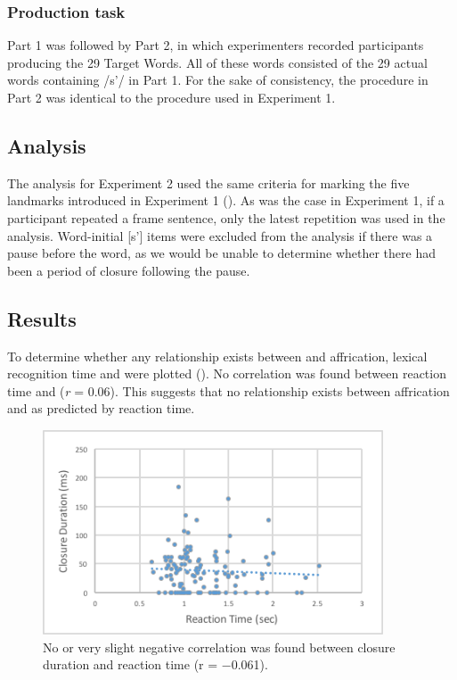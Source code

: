 \documentclass[output=paper
,newtxmath
,modfonts
,nonflat]{langsci/langscibook}
\begin{document}
\subsubsection{Production task}\label{sec:moeng:6.1.2.2}

Part 1 was followed by Part 2, in which experimenters recorded participants producing the 29 Target Words. All of these words consisted of the 29 actual words containing /s’/ in Part 1. For the sake of consistency, the procedure in Part 2 was identical to the procedure used in Experiment 1.

\subsection{Analysis}\label{sec:moeng:6.2}

The analysis for Experiment 2 used the same criteria for marking the five landmarks introduced in Experiment 1 (). As was the case in Experiment 1, if a participant repeated a frame sentence, only the latest repetition was used in the analysis. Word-initial [s’] items were excluded from the analysis if there was a pause before the word, as we would be unable to determine whether there had been a period of closure following the pause.

\subsection{Results}\label{sec:moeng:6.3}

To determine whether any relationship exists between  and affrication, lexical recognition time and  were plotted (). No correlation was found between reaction time and  (\textit{r} = 0.06). This suggests that no relationship exists between affrication and  as predicted by reaction time.

\begin{figure}
\includegraphics[width=0.9\textwidth]{figures/fig-moeng-5}
\caption{No or very slight negative correlation was found between closure duration and reaction time (r = −0.061).}
\label{fig:moeng:6}
\end{figure}
\end{document}
